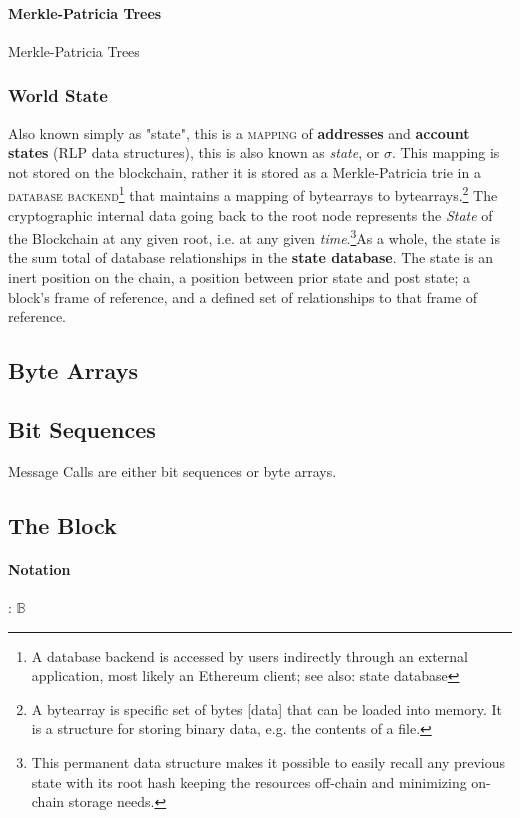 \documentclass[10pt,a4paper,leqno,bibliography=totoc]{scrartcl}
\newenvironment{alphafootnotes}
{\par\edef\savedfootnotenumber{\number\value{footnote}}
\renewcommand{\thefootnote}{\alph{footnote}}
\setcounter{footnote}{0}}
{\par\setcounter{footnote}{\savedfootnotenumber}}
\begin{document}
\begin{alphafootnotes}
\begin{multicols*}{2}
				\paragraph{Merkle-Patricia Trees}
					Merkle-Patricia Trees
			
				\subsubsection{World State}
					Also known simply as "state", this is a \textsc{mapping} of \textbf{addresses} and \textbf{account states} (RLP data structures), this is also known as \textit{state}, or $\sigma$. This mapping is not stored on the blockchain, rather it is stored as a Merkle-Patricia \gls{trie} in a \textsc{database backend}\footnote{A database backend is accessed by users indirectly through an external application, most likely an Ethereum client; see also: \gls{state database}} that maintains a mapping of bytearrays to bytearrays.\footnote{A bytearray is specific set of bytes [data] that can be loaded into memory. It is a structure for storing binary data, e.g. the contents of a file.} The cryptographic internal data going back to the \gls{root node} represents the \textit{State} of the Blockchain at any given root, i.e. at any given \textit{time}.\footnote{This permanent data structure makes it possible to easily recall any previous state with its root hash keeping the resources off-chain and minimizing on-chain storage needs.}As a whole, the state is the sum total of database relationships in the \textbf{ \gls{state database}}. The state is an inert position on the chain, a position between prior state and post state; a block's frame of reference, and a defined set of relationships to that frame of reference.
		\subsection{Byte Arrays}

		\subsection{Bit Sequences}
			Message Calls are either bit sequences or byte arrays.

		\subsection{The Block}
			\paragraph{Notation}: $\mathbb{B}$

\end{multicols*}
\end{alphafootnotes}
\end{document}
